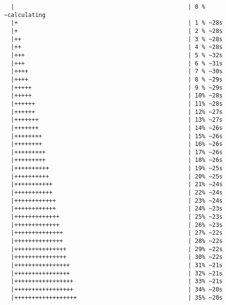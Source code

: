 \documentclass[12pt]{article}
\begin{document}
\begin{verbatim}
  |                                                  | 0 % ~calculating  
  |+                                                 | 1 % ~28s          
  |+                                                 | 2 % ~28s          
  |++                                                | 3 % ~28s          
  |++                                                | 4 % ~28s          
  |+++                                               | 5 % ~32s          
  |+++                                               | 6 % ~31s          
  |++++                                              | 7 % ~30s          
  |++++                                              | 8 % ~29s          
  |+++++                                             | 9 % ~29s          
  |+++++                                             | 10% ~28s          
  |++++++                                            | 11% ~28s          
  |++++++                                            | 12% ~27s          
  |+++++++                                           | 13% ~27s          
  |+++++++                                           | 14% ~26s          
  |++++++++                                          | 15% ~26s          
  |++++++++                                          | 16% ~26s          
  |+++++++++                                         | 17% ~26s          
  |+++++++++                                         | 18% ~26s          
  |++++++++++                                        | 19% ~25s          
  |++++++++++                                        | 20% ~25s          
  |+++++++++++                                       | 21% ~24s          
  |+++++++++++                                       | 22% ~24s          
  |++++++++++++                                      | 23% ~24s          
  |++++++++++++                                      | 24% ~23s          
  |+++++++++++++                                     | 25% ~23s          
  |+++++++++++++                                     | 26% ~23s          
  |++++++++++++++                                    | 27% ~22s          
  |++++++++++++++                                    | 28% ~22s          
  |+++++++++++++++                                   | 29% ~22s          
  |+++++++++++++++                                   | 30% ~22s          
  |++++++++++++++++                                  | 31% ~21s          
  |++++++++++++++++                                  | 32% ~21s          
  |+++++++++++++++++                                 | 33% ~21s          
  |+++++++++++++++++                                 | 34% ~20s          
  |++++++++++++++++++                                | 35% ~20s          

\end{verbatim}
\end{document}
